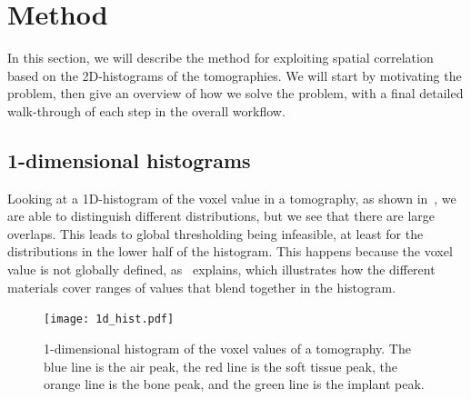 \section{Method}
\label{sec:method}

In this section, we will describe the method for exploiting spatial correlation based on the
2D-histograms of the tomographies. We will start by motivating the problem, then give an overview
of how we solve the problem, with a final detailed walk-through of each step in the overall workflow.

\subsection{1-dimensional histograms}
Looking at a 1D-histogram of the voxel value in a tomography, as shown in~, we are
able to distinguish different distributions, but we see that there are large overlaps. This leads to
global thresholding being infeasible, at least for the distributions in the lower half of the histogram.
This happens because the voxel value is not globally defined, as~ explains, which
illustrates how the different materials cover ranges of values that blend together in the histogram.

\begin{figure}
    \centering
    \texttt{[image: 1d\_hist.pdf]}
    \caption{1-dimensional histogram of the voxel values of a tomography. The
    blue line is the air peak, the red line is the soft tissue peak, the orange
    line is the bone peak, and the green line is the implant peak.}
    \label{fig:1d-hist}
\end{figure}

